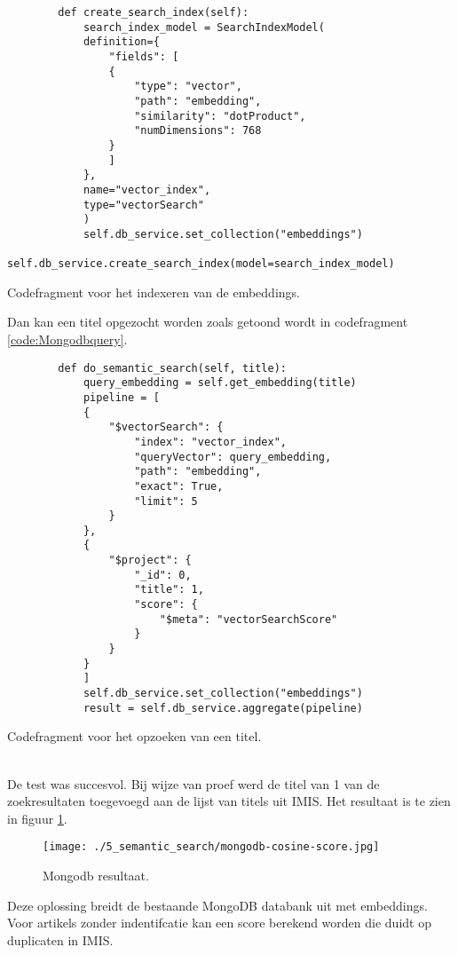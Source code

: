 \begin{listing}
    \begin{verbatim}
        def create_search_index(self):
            search_index_model = SearchIndexModel(
            definition={
                "fields": [
                {
                    "type": "vector",
                    "path": "embedding",
                    "similarity": "dotProduct",
                    "numDimensions": 768
                }
                ]
            },
            name="vector_index",
            type="vectorSearch"
            )
            self.db_service.set_collection("embeddings")
            self.db_service.create_search_index(model=search_index_model)
    \end{verbatim}
    \caption[Index codefragment]{Codefragment voor het indexeren van de embeddings.}
    \label{code:Mongodbindex}
\end{listing}
Dan kan een titel opgezocht worden zoals getoond wordt in codefragment \ref{code:Mongodbquery}.
\begin{listing}
    \begin{verbatim}
        def do_semantic_search(self, title):
            query_embedding = self.get_embedding(title)
            pipeline = [
            {
                "$vectorSearch": {
                    "index": "vector_index",
                    "queryVector": query_embedding,
                    "path": "embedding",
                    "exact": True,
                    "limit": 5
                }
            },
            {
                "$project": {
                    "_id": 0,
                    "title": 1,
                    "score": {
                        "$meta": "vectorSearchScore"
                    }
                }
            }
            ]
            self.db_service.set_collection("embeddings")
            result = self.db_service.aggregate(pipeline)
    \end{verbatim}
    \caption[Query codefragment]{Codefragment voor het opzoeken van een titel.}
    \label{code:Mongodbquery}
\end{listing}
\\
De test was succesvol. Bij wijze van proef werd de titel van 1 van de zoekresultaten toegevoegd aan de lijst van titels uit IMIS. Het resultaat is te zien in figuur \ref{fig:Mongodb}.
\begin{figure}
    \centering
    \texttt{[image: ./5\_semantic\_search/mongodb-cosine-score.jpg]}
    \caption[Mongodb resultaat.]{\label{fig:Mongodb}Mongodb resultaat.}
\end{figure}
Deze oplossing breidt de bestaande MongoDB databank uit met embeddings. Voor artikels zonder indentifcatie kan een score berekend worden die duidt op duplicaten in IMIS. 
